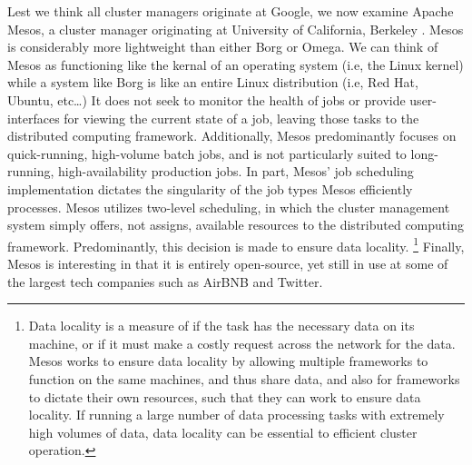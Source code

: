 Lest we think all cluster managers originate at Google, we now examine Apache
Mesos, a cluster manager originating at University of California, Berkeley
\cite{mesos}. Mesos is considerably more lightweight than either Borg or Omega.
We can think of Mesos as functioning like the kernal of an operating system
(i.e, the Linux kernel) while a system like Borg is like an entire Linux
distribution (i.e, Red Hat, Ubuntu, etc\ldots)
It does not seek to monitor the health of jobs or provide user-interfaces for viewing the
current state of a job, leaving those tasks to the distributed computing
framework. Additionally, Mesos predominantly focuses on quick-running,
high-volume batch jobs, and is not particularly suited to long-running,
high-availability production jobs. In part, Mesos'
job scheduling implementation dictates the singularity of the job types
Mesos efficiently processes. Mesos utilizes two-level scheduling, in which the
cluster management system simply offers, not assigns, available
resources to the distributed computing framework. Predominantly, this decision
is made to ensure data locality. \footnote{Data locality is a measure
of if the task has the necessary data on its machine, or if it must make a
costly request across the network for the data. Mesos works to ensure data
locality by allowing multiple frameworks to function on the same machines, and
thus share data, and also for frameworks to dictate their own resources, such
that they can work to ensure data locality. If running a large number of data
processing tasks with extremely high volumes of data, data locality can be
essential to efficient cluster operation.} Finally, Mesos is interesting in
that it is entirely open-source, yet still in use at some of the largest tech
companies such as AirBNB and Twitter.
